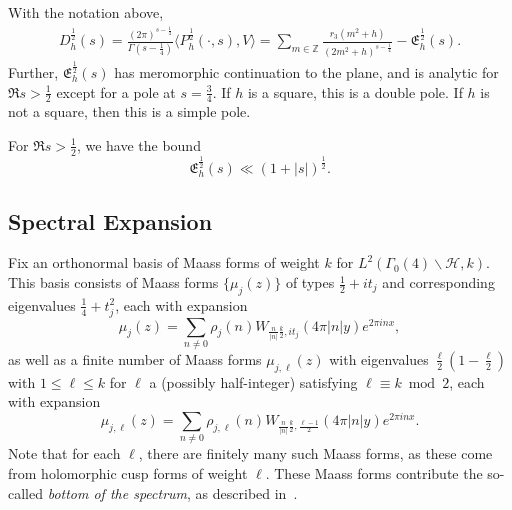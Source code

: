 \begin{proposition}\label{prop:nonspectral_analytic_props_dim_3}
  With the notation above,
  \begin{equation}
    \begin{split}
      D^{\frac{1}{2}}_h(s) = \frac{(2\pi)^{s - \frac{1}{4}}}{\Gamma(s - \frac{1}{4})}
      \langle P_h^{\frac{1}{2}}(\cdot, s), V\rangle
      =
      \sum_{m \in \mathbb{Z}}
      \frac{r_{3}(m^2 + h)}{(2m^2 + h)^{s - \frac{1}{4}}}
      -
      \mathfrak{E}_h^{\frac{1}{2}}(s).
    \end{split}
  \end{equation}
  Further, $\mathfrak{E}_h^{\frac{1}{2}}(s)$ has meromorphic continuation to the plane,
  and is analytic for $\Re s > \frac{1}{2}$ except for a pole at $s = \frac{3}{4}$.
  If $h$ is a square, this is a double pole.
  If $h$ is not a square, then this is a simple pole.

  For $\Re s > \frac{1}{2}$, we have the bound
  \begin{equation}
    \mathfrak{E}_h^{\frac{1}{2}}(s) \ll (1 + \lvert s \rvert)^{\frac{1}{2}}.
  \end{equation}
\end{proposition}




\subsection{Spectral Expansion}

Fix an orthonormal basis of Maass forms of weight $k$ for $L^2(\Gamma_0(4)\backslash
\mathcal{H}, k)$.
This basis consists of Maass forms $\{\mu_j(z)\}$ of types $\frac{1}{2} + it_j$ and
corresponding eigenvalues $\frac{1}{4} + t_j^2$, each with expansion
\begin{equation}
  \mu_j(z) = \sum_{n \neq 0} \rho_j(n) W_{\frac{n}{\lvert n \rvert} \frac{k}{2},
  it_j}(4\pi \lvert n \rvert y) e^{2\pi i n x},
\end{equation}
as well as a finite number of Maass forms $\mu_{j,\ell}(z)$ with eigenvalues
$\frac{\ell}{2}(1 - \frac{\ell}{2})$ with $1 \leq \ell \leq k$ for $\ell$ a (possibly
half-integer) satisfying $\ell \equiv k \bmod 2$, each with expansion
\begin{equation}
  \mu_{j, \ell}(z) = \sum_{n \neq 0} \rho_{j,\ell}(n) W_{\frac{n}{\lvert n \rvert}
  \frac{k}{2}, \frac{\ell-1}{2}}(4\pi \lvert n \rvert y) e^{2\pi i n x}.
\end{equation}
Note that for each $\ell$, there are finitely many such Maass forms, as these come from
holomorphic cusp forms of weight $\ell$.
These Maass forms contribute the so-called \emph{bottom of the spectrum}, as described
in~\cite[Chapter 3]{GoldfeldHundleyI}.



